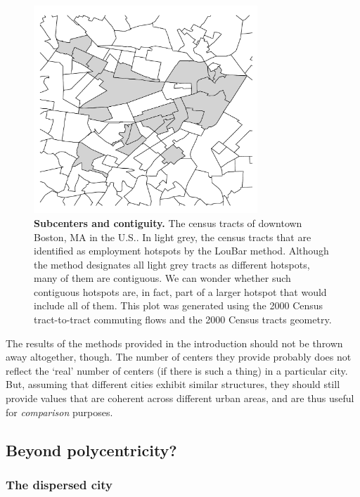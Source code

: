 \begin{figure}[!h]
    \centering
    \includegraphics[width=0.75\textwidth]{gfx/chapter-monocentric/hotspots_boston.pdf}
    \caption{{\bf Subcenters and contiguity.} The census tracts of downtown Boston, MA in the U.S.. In light grey,
    the census tracts that are identified as employment hotspots by the LouBar
method. Although the method designates all light grey tracts as different hotspots,
many of them are contiguous. We can wonder whether such contiguous
hotspots are, in fact, part of a larger hotspot that would include all of them.
This plot was generated using the 2000 Census tract-to-tract
commuting flows and the 2000 Census tracts geometry.\label{fig:hotspots_boston}}
\end{figure}


The results of the methods provided in the introduction should not be thrown
away altogether, though. The number of centers they provide probably does not
reflect the `real' number of centers (if there is such a thing) in a particular
city. But, assuming that different cities exhibit similar structures, they
should still provide values that are coherent across different urban areas, and
are thus useful for \emph{comparison} purposes.\\


\subsection{Beyond polycentricity?}
\label{sec:beyond_polycentricity}


\subsubsection{The dispersed city}
\label{sub:the_dispersed_city}

